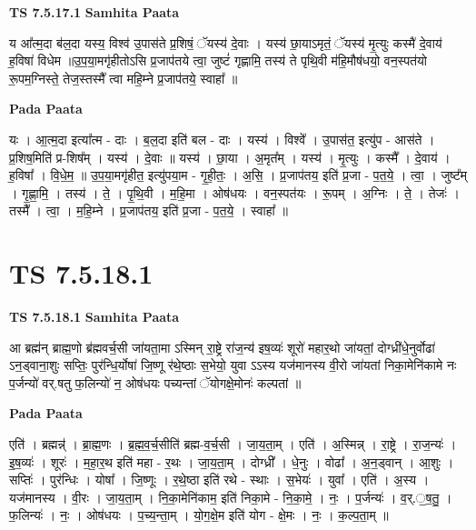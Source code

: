 \documentclass[17pt]{extarticle}
\begin{document}
\textbf{TS 7.5.17.1 } \newline
\textbf{Samhita Paata} \newline

य आ᳚त्म॒दा ब॑ल॒दा यस्य॒ विश्व॑ उ॒पास॑ते प्र॒शिषं॒ ॅयस्य॑ दे॒वाः । यस्य॑ छा॒याऽमृतं॒ ॅयस्य॑ मृ॒त्युः कस्मै॑ दे॒वाय॑ ह॒विषा॑ विधेम ॥उ॒प॒या॒मगृ॑हीतोऽसि प्र॒जाप॑तये त्वा॒ जुष्टं॑ गृह्णामि॒ तस्य॑ ते पृथि॒वी म॑हि॒मौष॑धयो॒ वन॒स्पत॑यो रू॒पम॒ग्निस्ते॒ तेज॒स्तस्मै᳚ त्वा महि॒म्ने प्र॒जाप॑तये॒ स्वाहा᳚ ॥ \newline

\textbf{Pada Paata} \newline

यः । आ॒त्म॒दा इत्या᳚त्म - दाः । ब॒ल॒दा इति॑ बल - दाः । यस्य॑ । विश्वे᳚ । उ॒पास॑त॒ इत्यु॑प - आस॑ते । प्र॒शिष॒मिति॑ प्र-शिष᳚म् । यस्य॑ । दे॒वाः ॥ यस्य॑ । छा॒या । अ॒मृत᳚म् । यस्य॑ । मृ॒त्युः । कस्मै᳚ । दे॒वाय॑ । ह॒विषा᳚ । वि॒धे॒म॒ ॥ उ॒प॒या॒मगृ॑हीत॒ इत्यु॑पया॒म - गृ॒ही॒तः॒ । अ॒सि॒ । प्र॒जाप॑तय॒ इति॑ प्र॒जा - प॒त॒ये॒ । त्वा॒ । जुष्ट᳚म् । गृ॒ह्णा॒मि॒ । तस्य॑ । ते॒ । पृ॒थि॒वी । म॒हि॒मा । ओष॑धयः । वन॒स्पत॑यः । रू॒पम् । अ॒ग्निः । ते॒ । तेजः॑ । तस्मै᳚ । त्वा॒ । म॒हि॒म्ने । प्र॒जाप॑तय॒ इति॑ प्र॒जा - प॒त॒ये॒ । स्वाहा᳚ ॥  \newline




\section*{ TS 7.5.18.1 }

\textbf{TS 7.5.18.1 } \newline
\textbf{Samhita Paata} \newline

आ ब्रह्म॑न् ब्राह्म॒णो ब्र॑ह्मवर्च॒सी जा॑यता॒मा ऽस्मिन् रा॒ष्ट्रे रा॑ज॒न्य॑ इष॒व्यः॑ शूरो॑ महार॒थो जा॑यतां॒ दोग्ध्री॑धे॒नुर्वोढा॑ ऽन॒ड्वाना॒शुः सप्तिः॒ पुर॑न्धि॒र्योषा॑ जि॒ष्णू र॑थे॒ष्ठाः स॒भेयो॒ युवा ऽऽस्य यज॑मानस्य वी॒रो जा॑यतां निका॒मेनि॑कामे नः प॒र्जन्यो॑ वर्.षतु फ॒लिन्यो॑ न॒ ओष॑धयः पच्यन्तां ॅयोगक्षे॒मोनः॑ कल्पतां ॥ \newline

\textbf{Pada Paata} \newline

एति॑ । ब्रह्मन्न्॑ । ब्रा॒ह्म॒णः । ब्र॒ह्म॒व॒र्च॒सीति॑ ब्रह्म-व॒र्च॒सी । जा॒य॒ता॒म् । एति॑ । अ॒स्मिन्न् । रा॒ष्ट्रे । रा॒ज॒न्यः॑ । इ॒ष॒व्यः॑ । शूरः॑ । म॒हा॒र॒थ इति॑ महा - र॒थः । जा॒य॒ता॒म् । दोग्ध्री᳚ । धे॒नुः । वोढा᳚ । अ॒न॒ड्वान् । आ॒शुः । सप्तिः॑ । पुर॑न्धिः । योषा᳚ । जि॒ष्णूः । र॒थे॒ष्ठा इति॑ रथे - स्थाः । स॒भेयः॑ । युवा᳚ । एति॑ । अ॒स्य । यज॑मानस्य । वी॒रः । जा॒य॒ता॒म् । नि॒का॒मेनि॑काम॒ इति॑ निका॒मे - नि॒का॒मे॒ । नः॒ । प॒र्जन्यः॑ । व॒र्.॒ष॒तु॒ । फ॒लिन्यः॑ । नः॒ । ओष॑धयः । प॒च्य॒न्ता॒म् । यो॒ग॒क्षे॒म इति॑ योग - क्षे॒मः । नः॒ । क॒ल्प॒ता॒म् ॥  \newline
\end{document}
